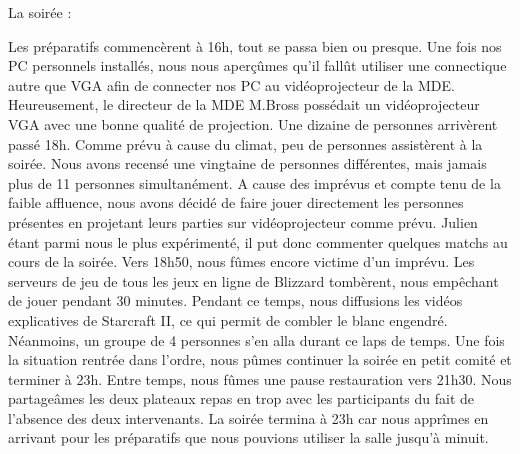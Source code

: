La soirée :

Les préparatifs commencèrent à 16h, tout se passa bien ou presque. Une fois nos PC personnels
installés, nous nous aperçûmes qu’il fallût utiliser une connectique autre que VGA afin de
connecter nos PC au vidéoprojecteur de la MDE. Heureusement, le directeur de la MDE M.Bross
possédait un vidéoprojecteur VGA avec une bonne qualité de projection.
Une dizaine de personnes arrivèrent passé 18h. Comme prévu à cause du climat, peu de
personnes assistèrent à la soirée. Nous avons recensé une vingtaine de personnes
différentes, mais jamais plus de 11 personnes simultanément.
A cause des imprévus et compte tenu de la faible affluence, nous avons décidé de faire jouer
directement les personnes présentes en projetant leurs parties sur vidéoprojecteur comme
prévu. Julien étant parmi nous le plus expérimenté, il put donc commenter quelques matchs
au cours de la soirée.
Vers 18h50, nous fûmes encore victime d’un imprévu. Les serveurs de jeu de tous les jeux en
ligne de Blizzard tombèrent, nous empêchant de jouer pendant 30 minutes. Pendant ce
temps, nous diffusions les vidéos explicatives de Starcraft II, ce qui permit de combler le
blanc engendré. Néanmoins, un groupe de 4 personnes s’en alla durant ce laps de temps.
Une fois la situation rentrée dans l’ordre, nous pûmes continuer la soirée en petit comité et
terminer à 23h. Entre temps, nous fûmes une pause restauration vers 21h30. Nous
partageâmes les deux plateaux repas en trop avec les participants du fait de l’absence des
deux intervenants. La soirée termina à 23h car nous apprîmes en arrivant pour les préparatifs
que nous pouvions utiliser la salle jusqu’à minuit.

